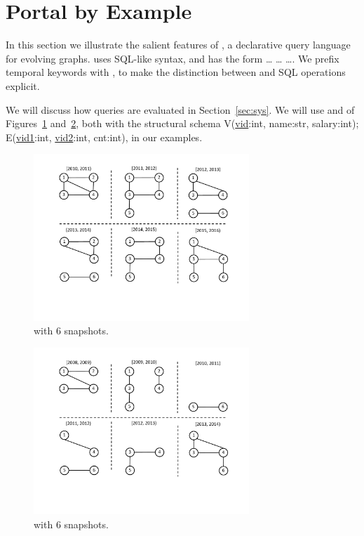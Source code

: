 \section{Portal by Example}
\label{sec:example}

In this section we illustrate the salient features of \ql, a
declarative query language for evolving graphs. \ql uses SQL-like
syntax, and has the form  \ldots {} \ldots
{} \ldots {}.  We prefix temporal keywords
with , to make the distinction between \ql and SQL operations
explicit.

We will discuss how \ql queries are evaluated in
Section~\ref{sec:sys}.  We will use \tgs {} and  of
Figures~\ref{fig:tg} and~\ref{fig:tg_t2}, both with the structural
schema V(\underline{vid}:int, name:str, salary:int);
E(\underline{vid1}:int, \underline{vid2}:int, cnt:int), in our
examples.

\begin{figure}[t!]
\includegraphics[width=3.2in]{figs/6snaps.pdf}
\caption{\tg {} with 6 snapshots.} 
\label{fig:tg}
\end{figure}

\begin{figure}[t!]
\includegraphics[width=3.2in]{figs/t2.pdf}
\caption{\tg {} with 6 snapshots.} 
\label{fig:tg_t2}
\end{figure}

